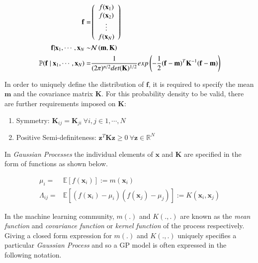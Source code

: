 \documentclass{article}
\begin{document}
\begin{align}
  \mathbf{f} = & \left( \begin{array}{c} f(\mathbf{x}_1) \\ f(\mathbf{x}_2) \\ \vdots \\ f(\mathbf{x}_N) \end{array} \right) \label{eq:fvalues}\\
  \vspace{2\baselineskip}
  \mathbf{f} | \mathbf{x}_1, \cdots, \mathbf{x}_N \sim & \mathcal{N}\left( \mathbf{m}, \mathbf{K} \right)  \label{eq:normal}\\
  \vspace{2\baselineskip}
  \mathbb{P}( \mathbf{f} \ | \ \mathbf{x}_1, \cdots, \mathbf{x}_N) = & \frac{1}{(2\pi)^{n/2} det(\mathbf{K})^{1/2}} exp \left(-\frac{1}{2} (\mathbf{f} - \mathbf{m})^T \mathbf{K}^{-1} (\mathbf{f} - \mathbf{m}) \right) \label{eq:sto}
\end{align}

In order to uniquely define the distribution of $\mathbf{f}$, it is
required to specify the mean $\mathbf{m}$ and the covariance matrix
$\mathbf{K}$. For this probability density to be valid, there are
further requirements imposed on $\mathbf{K}$: 

\begin{enumerate}
\item Symmetry: $\mathbf{K}_{ij} = \mathbf{K}_{ji} \ \forall i,j \in {1, \cdots, N} $ 
\item Positive Semi-definiteness: $\mathbf{z}^T \mathbf{K} \mathbf{z} \geq 0 \ \forall \mathbf{z} \in \mathbb{R}^N$  
\end{enumerate}

In \emph{Gaussian Processes} the individual elements of $\mathbf{x}$
and $\mathbf{K}$ are specified in the form of functions as shown
below.

\begin{align}
  \mu_i = & \mathbb{E}[f(\mathbf{x}_i)] := m(\mathbf{x}_i) \\
  \Lambda_{ij} = & \mathbb{E}[(f(\mathbf{x}_i) - \mu_i)(f(\mathbf{x}_j) - \mu_j)] := K(\mathbf{x}_i, \mathbf{x}_j)
\end{align}

In the machine learning community, $m(.)$ and $K(.,.)$ are known as
the \emph{mean function} and \emph{covariance function} or
\emph{kernel function} of the process respectively. Giving a closed
form expression for $m(.)$ and $K(.,.)$ uniquely specifies a
particular \emph{Gaussian Process} and so a GP model is often
expressed in the following notation.
\end{document}
